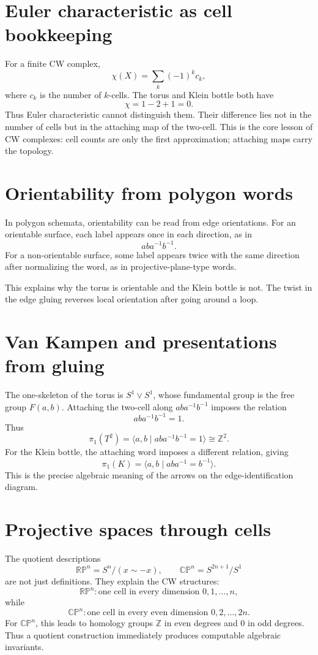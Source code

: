 \section{Euler characteristic as cell bookkeeping}

For a finite CW complex,
\[
  \chi(X)=\sum_k(-1)^k c_k,
\]
where \(c_k\) is the number of \(k\)-cells.  The torus and Klein bottle both have
\[
  \chi=1-2+1=0.
\]
Thus Euler characteristic cannot distinguish them.  Their difference lies not in the number of cells but in the attaching map of the two-cell.  This is the core lesson of CW complexes: cell counts are only the first approximation; attaching maps carry the topology.

\section{Orientability from polygon words}

In polygon schemata, orientability can be read from edge orientations.  For an orientable surface, each label appears once in each direction, as in
\[
  aba^{-1}b^{-1}.
\]
For a non-orientable surface, some label appears twice with the same direction after normalizing the word, as in projective-plane-type words.

This explains why the torus is orientable and the Klein bottle is not.  The twist in the edge gluing reverses local orientation after going around a loop.

\section{Van Kampen and presentations from gluing}

The one-skeleton of the torus is \(S^1\vee S^1\), whose fundamental group is the free group \(F(a,b)\).  Attaching the two-cell along \(aba^{-1}b^{-1}\) imposes the relation
\[
  aba^{-1}b^{-1}=1.
\]
Thus
\[
  \pi_1(T^2)=\langle a,b\mid aba^{-1}b^{-1}=1\rangle\cong\mathbb Z^2.
\]
For the Klein bottle, the attaching word imposes a different relation, giving
\[
  \pi_1(K)=\langle a,b\mid aba^{-1}=b^{-1}\rangle.
\]
This is the precise algebraic meaning of the arrows on the edge-identification diagram.

\section{Projective spaces through cells}

The quotient descriptions
\[
  \mathbb{RP}^n=S^n/(x\sim -x),\qquad
  \mathbb{CP}^n=S^{2n+1}/S^1
\]
are not just definitions.  They explain the CW structures:
\[
  \mathbb{RP}^n: \text{one cell in every dimension }0,
  1,
  \ldots,n,
\]
while
\[
  \mathbb{CP}^n: \text{one cell in every even dimension }0,2,
  \ldots,2n.
\]
For \(\mathbb{CP}^n\), this leads to homology groups \(\mathbb Z\) in even degrees and \(0\) in odd degrees.  Thus a quotient construction immediately produces computable algebraic invariants.

